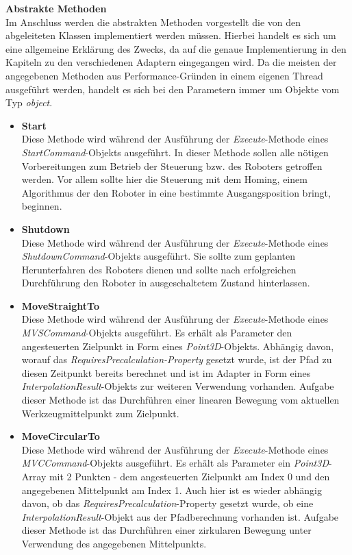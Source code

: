 \textbf{Abstrakte Methoden}\\
Im Anschluss werden die abstrakten Methoden vorgestellt die von den abgeleiteten Klassen implementiert werden müssen. Hierbei handelt es sich um eine allgemeine Erklärung des Zwecks, da auf die genaue Implementierung in den Kapiteln zu den verschiedenen Adaptern eingegangen wird. Da die meisten der angegebenen Methoden aus Performance-Gründen in einem eigenen Thread ausgeführt werden, handelt es sich bei den Parametern immer um Objekte vom Typ \textit{object}. 
\begin{itemize}
\item \textbf{Start}\\
Diese Methode wird während der Ausführung der \textit{Execute}-Methode eines \textit{StartCommand}-Objekts ausgeführt. In dieser Methode sollen alle nötigen Vorbereitungen zum Betrieb der Steuerung bzw. des Roboters getroffen werden. Vor allem sollte hier die Steuerung mit dem Homing, einem Algorithmus der den Roboter in eine bestimmte Ausgangsposition bringt, beginnen.
\item \textbf{Shutdown}\\
Diese Methode wird während der Ausführung der \textit{Execute}-Methode eines \textit{ShutdownCommand}-Objekts ausgeführt. Sie sollte zum geplanten Herunterfahren des Roboters dienen und sollte nach erfolgreichen Durchführung den Roboter in ausgeschaltetem Zustand hinterlassen.
\item \textbf{MoveStraightTo}\\
Diese Methode wird während der Ausführung der \textit{Execute}-Methode eines \textit{MVSCommand}-Objekts ausgeführt. Es erhält als Parameter den angesteuerten Zielpunkt in Form eines \textit{Point3D}-Objekts. Abhängig davon, worauf das \textit{RequiresPrecalculation-Property} gesetzt wurde, ist der Pfad zu diesen Zeitpunkt bereits berechnet und ist im Adapter in Form eines \textit{InterpolationResult}-Objekts zur weiteren Verwendung vorhanden. Aufgabe dieser Methode ist das Durchführen einer linearen Bewegung vom aktuellen Werkzeugmittelpunkt zum Zielpunkt.
\item \textbf{MoveCircularTo}\\
Diese Methode wird während der Ausführung der \textit{Execute}-Methode eines \textit{MVCCommand}-Objekts ausgeführt. Es erhält als Parameter ein \textit{Point3D}-Array mit 2 Punkten - dem angesteuerten Zielpunkt am Index 0 und den angegebenen Mittelpunkt am Index 1. Auch hier ist es wieder abhängig davon, ob das \textit{RequiresPrecalculation}-Property gesetzt wurde, ob eine \textit{InterpolationResult}-Objekt aus der Pfadberechnung vorhanden ist. Aufgabe dieser Methode ist das Durchführen einer zirkularen Bewegung unter Verwendung des angegebenen Mittelpunkts.

\end{itemize}
